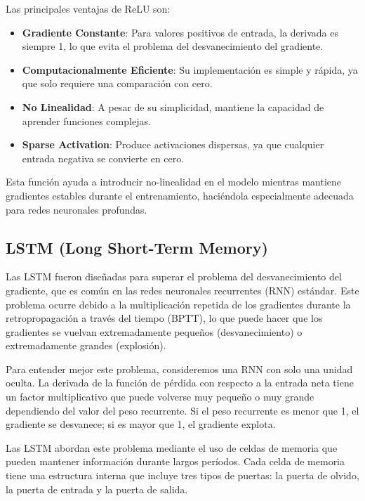 Las principales ventajas de ReLU son:

\begin{itemize}
    \item \textbf{Gradiente Constante}: Para valores positivos de entrada, la derivada es siempre 1, lo que evita el problema del desvanecimiento del gradiente.
    \item \textbf{Computacionalmente Eficiente}: Su implementación es simple y rápida, ya que solo requiere una comparación con cero.
    \item \textbf{No Linealidad}: A pesar de su simplicidad, mantiene la capacidad de aprender funciones complejas.
    \item \textbf{Sparse Activation}: Produce activaciones dispersas, ya que cualquier entrada negativa se convierte en cero.
\end{itemize}

Esta función ayuda a introducir no-linealidad en el modelo mientras mantiene gradientes estables durante el entrenamiento, haciéndola especialmente adecuada para redes neuronales profundas.

\subsection{LSTM (Long Short-Term Memory)}

Las LSTM fueron diseñadas para superar el problema del desvanecimiento del gradiente, que es común en las redes neuronales recurrentes (RNN) estándar. Este problema ocurre debido a la multiplicación repetida de los gradientes durante la retropropagación a través del tiempo (BPTT), lo que puede hacer que los gradientes se vuelvan extremadamente pequeños (desvanecimiento) o extremadamente grandes (explosión).

Para entender mejor este problema, consideremos una RNN con solo una unidad oculta. La derivada de la función de pérdida con respecto a la entrada neta tiene un factor multiplicativo que puede volverse muy pequeño o muy grande dependiendo del valor del peso recurrente. Si el peso recurrente es menor que 1, el gradiente se desvanece; si es mayor que 1, el gradiente explota.

Las LSTM abordan este problema mediante el uso de celdas de memoria que pueden mantener información durante largos períodos. Cada celda de memoria tiene una estructura interna que incluye tres tipos de puertas: la puerta de olvido, la puerta de entrada y la puerta de salida.


